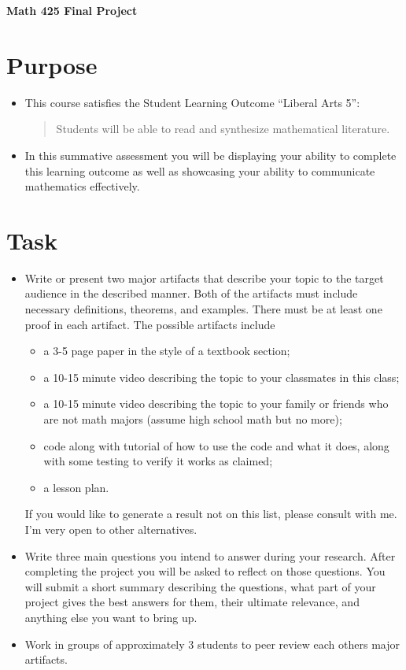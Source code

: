 \documentclass[12pt]{article}
\begin{document}
	\begin{center}
		{\Large \bf Math 425 Final Project}
	\end{center}
	\section*{Purpose}
	\begin{itemize}
		\item This course satisfies the Student Learning Outcome ``Liberal Arts 5'':
			\begin{quote}
				Students will be able to read and synthesize mathematical literature.
			\end{quote}
		\item In this summative assessment you will be displaying your ability to complete this learning outcome as well as showcasing your ability to communicate mathematics effectively.
	\end{itemize}
	\section*{Task}
	\begin{itemize}
		\item Write or present two major artifacts that describe your topic to the target audience in the described manner. Both of the artifacts must include necessary definitions, theorems, and examples. There must be at least one proof in each artifact. The possible artifacts include
			\begin{itemize}
				\item a 3-5 page paper in the style of a textbook section;
				\item a 10-15 minute video describing the topic to your classmates in this class;
				\item a 10-15 minute video describing the topic to your family or friends who are not math majors (assume high school math but no more);
				\item code along with tutorial of how to use the code and what it does, along with some testing to verify it works as claimed;
				\item a lesson plan.
			\end{itemize}
			If you would like to generate a result not on this list, please consult with me. I'm very open to other alternatives.
		\item Write three main questions you intend to answer during your research. After completing the project you will be asked to reflect on those questions. You will submit a short summary describing the questions, what part of your project gives the best answers for them, their ultimate relevance, and anything else you want to bring up. 
		\item Work in groups of approximately 3 students to peer review each others major artifacts.
	\end{itemize}
\end{document}
